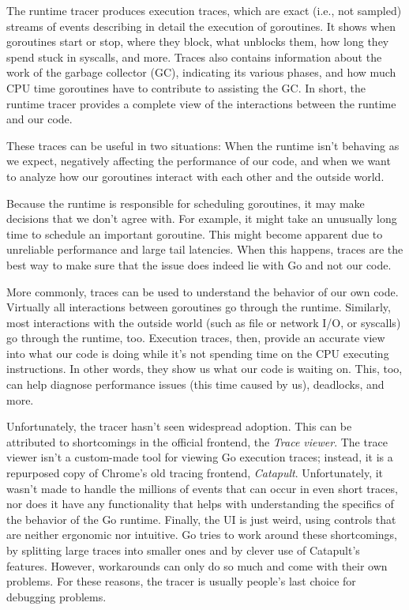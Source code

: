 \documentclass[10pt,letterpaper,oneside,openany,showtrims]{memoir}
\begin{document}
The runtime tracer produces execution traces, which are exact (i.e., not sampled) streams of events describing in detail the execution of goroutines.
It shows when goroutines start or stop, where they block, what unblocks them, how long they spend stuck in syscalls, and more.
Traces also contains information about the work of the garbage collector (GC), indicating its various phases, and how much CPU time goroutines have to contribute to assisting the GC.
In short, the runtime tracer provides a complete view of the interactions between the runtime and our code.

These traces can be useful in two situations:
When the runtime isn't behaving as we expect, negatively affecting the performance of our code,
and when we want to analyze how our goroutines interact with each other and the outside world.

Because the runtime is responsible for scheduling goroutines, it may make decisions that we don't agree with.
For example, it might take an unusually long time to schedule an important goroutine.
This might become apparent due to unreliable performance and large tail latencies.
When this happens, traces are the best way to make sure that the issue does indeed lie with Go and not our code.

More commonly, traces can be used to understand the behavior of our own code.
Virtually all interactions between goroutines go through the runtime.
Similarly, most interactions with the outside world (such as file or network I/O, or syscalls) go through the runtime, too.
Execution traces, then, provide an accurate view into what our code is doing while it's not spending time on the CPU executing instructions.
In other words, they show us what our code is waiting on.
This, too, can help diagnose performance issues (this time caused by us), deadlocks, and more.

Unfortunately, the tracer hasn't seen widespread adoption.
This can be attributed to shortcomings in the official frontend, the \emph{Trace viewer}.
The trace viewer isn't a custom-made tool for viewing Go execution traces;
instead, it is a repurposed copy of Chrome's old tracing frontend, \emph{Catapult}.
Unfortunately, it wasn't made to handle the millions of events that can occur in even short traces,
nor does it have any functionality that helps with understanding the specifics of the behavior of the Go runtime.
Finally, the UI is just weird, using controls that are neither ergonomic nor intuitive.
Go tries to work around these shortcomings, by splitting large traces into smaller ones and by clever use of Catapult's features.
However, workarounds can only do so much and come with their own problems.
For these reasons, the tracer is usually people's last choice for debugging problems.
\end{document}
